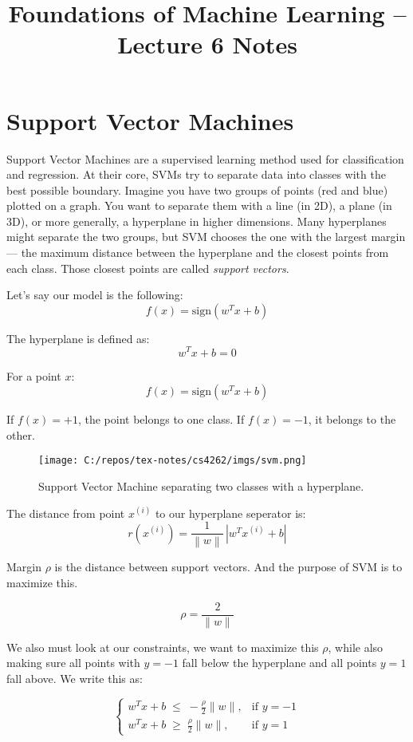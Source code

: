 \documentclass[11pt]{article}
\title{Foundations of Machine Learning -- Lecture 6 Notes}
\author{}
\date{}
\begin{document}
\maketitle

\section*{Support Vector Machines}
Support Vector Machines are a supervised learning method used for classification and regression. 
At their core, SVMs try to separate data into classes with the best possible boundary. 
Imagine you have two groups of points (red and blue) plotted on a graph. 
You want to separate them with a line (in 2D), a plane (in 3D), or more generally, a hyperplane in higher dimensions. 
Many hyperplanes might separate the two groups, but SVM chooses the one with the largest margin — the maximum distance between the hyperplane and the closest points from each class. 
Those closest points are called \textit{support vectors}.

\medskip

Let’s say our model is the following:
\[
f(x) = \text{sign}(w^T x + b)
\]

The hyperplane is defined as:
\[
w^T x + b = 0
\]

For a point $x$:
\[
f(x) = \text{sign}(w^T x + b)
\]

If $f(x) = +1$, the point belongs to one class.  
If $f(x) = -1$, it belongs to the other.

\begin{figure}[h!]
\centering
\texttt{[image: C:/repos/tex-notes/cs4262/imgs/svm.png]}
\caption{Support Vector Machine separating two classes with a hyperplane.}
\end{figure}

\pagebreak
The distance from point $x^(i)$ to our hyperplane seperator is:
\[
r(x^{(i)}) = \frac{1}{\left\lVert w \right\rVert} \, \left| w^T x^{(i)} + b \right|
\]

Margin $\rho$ is the distance between support vectors. And the purpose of SVM is to maximize this.

\[
\rho = \frac{2}{\|w\|}
\]

We also must look at our constraints, we want to maximize this $\rho$, while also making sure all points with $y=-1$ fall below the hyperplane and all points $y=1$ fall above. We write this as:

\[
\begin{cases}
w^T x + b \;\leq\; -\tfrac{\rho}{2}\|w\|, & \text{if } y = -1 \\[6pt]
w^T x + b \;\geq\; \tfrac{\rho}{2}\|w\|, & \text{if } y = 1
\end{cases}
\]
\end{document}
